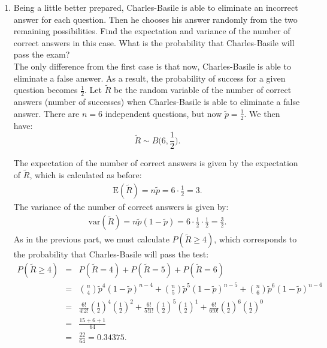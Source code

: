 \documentclass[12pt,thmsa]{article}
\begin{document}
\begin{enumerate}
\item Being a little better prepared, Charles-Basile is able to eliminate an incorrect answer for each question. Then he chooses his answer randomly from the two remaining possibilities.
Find the expectation and variance of the number of correct answers in this case.
What is the probability that Charles-Basile will pass the exam?\\

The only difference from the first case is that now, Charles-Basile is able to eliminate a false answer. As a result, the probability of success for a given question becomes $\frac{1}{2}$.
Let $ \tilde{R} $ be the random variable of the number of correct answers (number of successes) when Charles-Basile is able to eliminate a false answer. There are $ n = 6 $ independent questions, but now $ \tilde{p} = \frac{1}{2} $. We then have: $$ \tilde{R} \sim B \big(6, \frac{1}{2} \big). $$

The expectation of the number of correct answers is given by the expectation of $ \tilde{R} $, which is calculated as before:
\begin{eqnarray*}
   \text{E}(\tilde{R})=n\tilde{p}=6 \cdot \frac{1}{2}=3.
  \end{eqnarray*}
The variance of the number of correct answers is given by:
\begin{eqnarray*}
\text{var}(\tilde{R})=n\tilde{p}(1-\tilde{p})=6 \cdot \frac{1}{2}\cdot \frac{1}{2}=\frac{3}{2}.
\end{eqnarray*}
As in the previous part, we must calculate $P(\tilde{R} \geq 4) $, which corresponds to the probability that Charles-Basile will pass the test:
 \begin{eqnarray*}
   P(\tilde{R}\geq 4) & = & \left. P(\tilde{R}=4) + P(\tilde{R}=5) + P(\tilde{R}=6) \right. \nonumber \\
   & = & \left. \binom{n}{4}\tilde{p}^{4}(1-\tilde{p})^{n-4} + \binom{n}{5}\tilde{p}^{5}(1-\tilde{p})^{n-5} + \binom{n}{6}\tilde{p}^{6}(1-\tilde{p})^{n-6} \right. \nonumber \\
   & = & \left.  \frac{6!}{4!2!}\left(\frac{1}{2}\right)^{4}\left(\frac{1}{2}\right)^{2} + \frac{6!}{5!1!}\left(\frac{1}{2}\right)^{5}\left(\frac{1}{2}\right)^{1} + \frac{6!}{6!0!}\left(\frac{1}{2}\right)^{6}\left(\frac{1}{2}\right)^{0} \right. \nonumber \\
     & = & \left.  \frac{15+6+1}{64}  \right. \nonumber \\
   & = & \left. \frac{22}{64} = 0.34375. \right. \nonumber \\
  \end{eqnarray*}

\end{enumerate}
\end{document}
